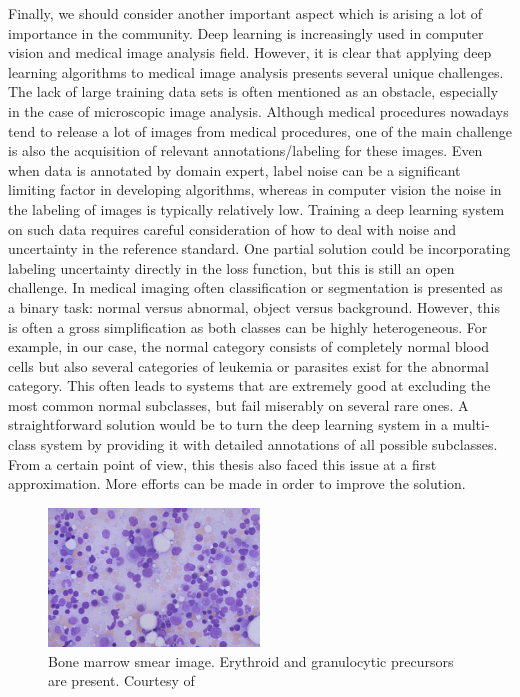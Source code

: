 Finally, we should consider another important aspect which is arising a lot of importance in the community. Deep learning is increasingly used in computer vision and medical image analysis field. However, it is clear that applying deep learning algorithms to medical image analysis presents several unique challenges. The lack of large training data sets is often mentioned as an obstacle, especially in the case of microscopic image analysis. Although medical procedures nowadays tend to release a lot of images from medical procedures, one of the main challenge is also the acquisition of relevant annotations/labeling for these images.
Even when data is annotated by domain expert, label noise can be a significant limiting factor in developing algorithms, whereas in computer vision the noise in the labeling of images is typically relatively low. Training a deep learning system on such data requires careful consideration of how to deal with noise and uncertainty in the reference standard. One partial solution could be incorporating labeling uncertainty directly in the loss function, but this is still an open challenge.
In medical imaging often classification or segmentation is presented as a binary task: normal versus abnormal, object versus background. However, this is often a gross simplification as both classes can be highly heterogeneous. For example, in our case, the normal category consists of completely normal blood cells but also several categories of leukemia or parasites exist for the abnormal category. This often leads to systems that are extremely good at excluding the most common normal subclasses, but fail miserably on several rare ones. A straightforward solution would be to turn the deep learning system in a multi-class system by providing it with detailed annotations of all possible subclasses. From a certain point of view, this thesis also faced this issue at a first approximation. More efforts can be made in order to improve the solution. 


\begin{figure}[h]
	\centering
	\includegraphics[width=0.5\textwidth]{images/bone_marrow}
	\caption[Bone marrow smear image.]{\label{fig:bone_marrow} Bone marrow smear image. Erythroid and granulocytic precursors are present. Courtesy of \cite{Med_Utah}}
\end{figure}